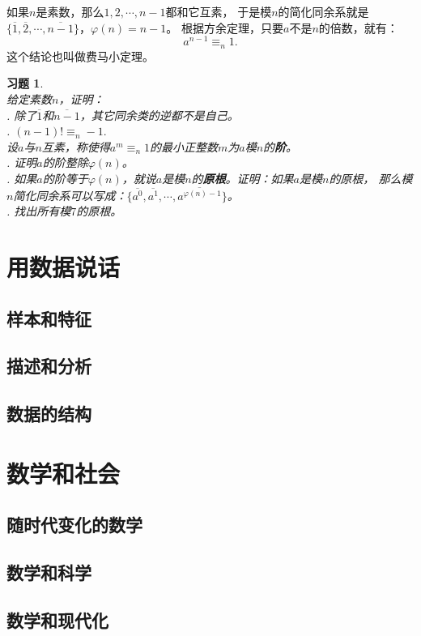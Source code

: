 \documentclass[12pt,UTF8]{ctexbook}
\newtheorem{xt}{习题}[section]
\begin{document}
如果$n$是素数，那么$1,2, \cdots , n-1$都和它互素，
于是模$n$的简化同余系就是$\{\overline{1},\overline{2}, \cdots , \overline{n-1}\}$，$\varphi(n) = n-1$。
根据方余定理，只要$a$不是$n$的倍数，就有：
$$ a^{n-1} \equiv_n 1 .$$
这个结论也叫做费马小定理。

\begin{xt}\label{xt:4-3-0}
    \mbox{}\\
    给定素数$n$，证明：\\
    . 除了$\overline{1}$和$\overline{n-1}$，其它同余类的逆都不是自己。\\
    . $(n-1)! \equiv_n -1.$ \\
    设$a$与$n$互素，称使得$a^m \equiv_n 1$的最小正整数$m$为$a$模$n$的\textbf{阶}。\\
    . 证明$a$的阶整除$\varphi(n)$。\\
    . 如果$a$的阶等于$\varphi(n)$，就说$a$是模$n$的\textbf{原根}。证明：如果$a$是模$n$的原根，
    那么模$n$简化同余系可以写成：$\{\overline{a^0}, \overline{a^1}, \cdots , \overline{a^{\varphi(n)-1}}\}$。\\
    . 找出所有模$7$的原根。
\end{xt}


\chapter{用数据说话}
\section{样本和特征}
\section{描述和分析}
\section{数据的结构}

\chapter{数学和社会}
\section{随时代变化的数学}
\section{数学和科学}
\section{数学和现代化}
\end{document}
